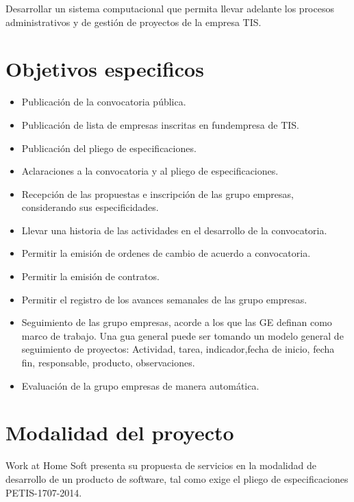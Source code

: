 \documentclass[11pt,letterpaper]{report}
\begin{document}
Desarrollar un sistema computacional que permita llevar adelante
los procesos administrativos y de gestión de proyectos de la empresa TIS.

\section{Objetivos especificos}
\begin{itemize}
 	\item Publicación de la convocatoria pública.
	\item Publicación de lista de empresas inscritas en fundempresa de TIS.
	\item Publicación del pliego de especificaciones.
	\item Aclaraciones a la convocatoria y al pliego de especificaciones.
	\item Recepción de las propuestas e inscripción de las grupo empresas, considerando sus especificidades.
	\item Llevar una historia de las actividades en el desarrollo de la convocatoria.
	\item Permitir la emisión de  ordenes de cambio de acuerdo a convocatoria.
	\item Permitir la emisión de contratos.
	\item Permitir el registro de los avances semanales de las grupo empresas.
	\item Seguimiento de las grupo empresas, acorde a los que las GE definan como marco de trabajo. Una gua general puede ser tomando un modelo general de seguimiento de proyectos: Actividad, tarea, indicador,fecha de inicio, fecha fin, responsable, producto, observaciones.
	\item Evaluación de la grupo empresas de manera automática.
\end{itemize}
\section{Modalidad del proyecto}
Work at Home Soft presenta su propuesta de servicios en la modalidad de desarrollo de un producto de software, tal como exige el pliego de especificaciones PETIS-1707-2014.
\end{document}

